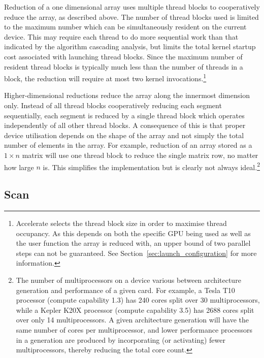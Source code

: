 Reduction of a one dimensional array uses multiple thread blocks to cooperatively reduce the array, as described above. The number of
thread blocks used is limited to the maximum number which can be simultaneously
resident on the current device. This may require each thread to do more
sequential work than that indicated by the algorithm cascading analysis,
but limits the total kernel startup cost associated with launching thread
blocks. Since the maximum number of resident thread blocks is typically much
less than the number of threads in a block, the reduction will require at most
two kernel invocations.\footnote{Accelerate selects the thread block size in
order to maximise thread occupancy. As this depends on both the specific GPU
being used as well as the user function the array is reduced with, an upper
bound of two parallel steps can not be guaranteed. See
Section~\ref{sec:launch_configuration} for more information.}

Higher-dimensional reductions reduce the array along the innermost dimension
only.
Instead of all thread blocks
cooperatively reducing each segment sequentially, each segment is reduced by a
single thread block which operates independently of all other thread blocks. A
consequence of this is that proper device utilisation depends on the shape of
the array and not simply the total number of elements in the array. For example,
reduction of an array stored as a $1 \times n$ matrix will use one thread
block to reduce the single matrix row,
no matter how large $n$ is. This simplifies the implementation but is clearly
not always ideal.\footnote{The number of multiprocessors on a device various
between architecture generation and performance of a given card. For example, a
Tesla T10 processor (compute capability 1.3) has 240 cores split over 30
multiprocessors, while a Kepler K20X processor (compute capability 3.5) has 2688
cores split over only 14 multiprocessors. A given architecture generation will
have the same number of cores per multiprocessor, and lower performance
processors in a generation are produced by incorporating (or activating) fewer
multiprocessors, thereby reducing the total core count.}


\subsection{Scan}
\label{sec:parallel_scan}

